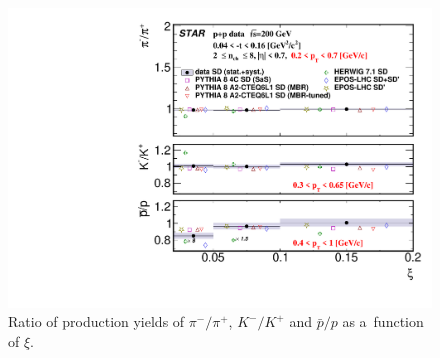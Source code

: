 \begin{figure}[b!]
	\centering
	\includegraphics[width=.99\textwidth,page=1]{chapters/chrgSTAR/img/results/ratio_xi.pdf}
	\caption{Ratio of production yields of $\pi^-/\pi^+$, $K^-/K^+$ and $\bar{p}/p$ as a~function of $\xi$. }
	\label{fig:results_mean_ratio_star}
	
\end{figure}

\FloatBarrier